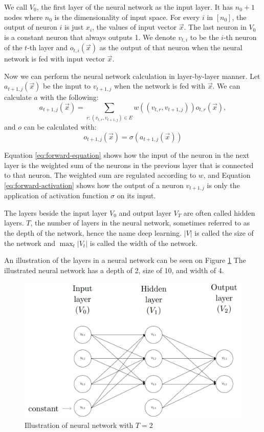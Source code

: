   We call $V_0$, the first layer of the neural network as the input layer. It has $n_0+1$ nodes where $n_0$ is the dimensionality of input space.
  For every $i$ in $[n_0]$, the output of neuron $i$ is just $x_i$, the values of input vector $\vec{x}$. The last neuron in $V_0$ is a constant neuron that always outputs 1.
  We denote $v_{t,i}$ to be the $i$-th neuron of the $t$-th layer and $o_{t,i}(\vec{x})$ as the output of that neuron when the neural network is fed with input vector $\vec{x}$.

  Now we can perform the neural network calculation in layer-by-layer manner.
  Let $a_{t+1,j}(\vec{x})$ be the input to $v_{t+1,j}$ when the network is fed with $\vec{x}$.
  We can calculate $a$ with the following:
  \begin{equation}
    a_{t+1,j}(\vec{x}) = \sum_{r : (v_{t,r}, v_{t+1,j}) \in E} w((v_{t,r}, v_{t+1,j}))o_{t,r}(\vec{x}),
    \label{eq:forward-equation}
  \end{equation}
  and $o$ can be calculated with:
  \begin{equation}
    o_{t+1,j}(\vec{x}) = \sigma(a_{t+1,j}(\vec{x}))
    \label{eq:forward-activation}
  \end{equation}

  Equation \ref{eq:forward-equation} shows how the input of the neuron in the next layer is the weighted sum of the neurons in the previous layer that is connected to that neuron.
  The weighted sum are regulated according to $w$, and Equation \ref{eq:forward-activation} shows how the output of a neuron $v_{t+1,j}$ is only the application of activation function $\sigma$ on its input.

  The layers beside the input layer $V_0$ and output layer $V_T$ are often called hidden layers.
  $T$, the number of layers in the neural network, sometimes referred to as the depth of the network, hence the name deep learning.
  $|V|$ is called the size of the network and $\max_t |V_t|$ is called the width of the network.
  
  An illustration of the layers in a neural network can be seen on Figure \ref{fig:neuralnets}
  The illustrated neural network has a depth of 2, size of 10, and width of 4.

  \begin{figure}
      \centering
      \includegraphics[width=.9\textwidth]{figures/neuralnets.png}
      \caption{Illustration of neural network with $T=2$}
      \label{fig:neuralnets}
  \end{figure}

